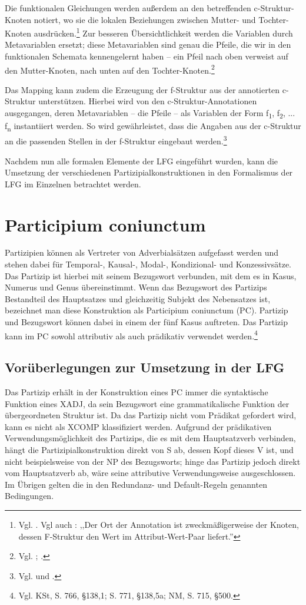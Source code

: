 \documentclass[12pt,a4paper]{article}
\begin{document}
Die funktionalen Gleichungen werden außerdem an den betreffenden c-Struktur-Knoten notiert, wo sie die lokalen Beziehungen zwischen Mutter- und Tochter-Knoten ausdrücken.\footnote{Vgl. \cite[69]{Falk}. Vgl auch \cite[12]{Skript}: ,,Der Ort der Annotation ist zweckmäßigerweise der Knoten, dessen F-Struktur den Wert im Attribut-Wert-Paar liefert.''} Zur besseren Übersichtlichkeit werden die Variablen durch Metavariablen ersetzt; diese Metavariablen sind genau die Pfeile, die wir in den funktionalen Schemata kennengelernt haben -- ein Pfeil nach oben verweist auf den Mutter-Knoten, nach unten auf den Tochter-Knoten.\footnote{Vgl. \cite[69]{Falk}; \cite[15-6]{Skript}.}

Das Mapping kann zudem die Erzeugung der f-Struktur aus der annotierten c-Struktur unterstützen. Hierbei wird von den c-Struktur-Annotationen ausgegangen, deren Metavariablen -- die Pfeile -- als Variablen der Form f\textsubscript{1}, f\textsubscript{2}, ... f\textsubscript{n} instantiiert werden. So wird gewährleistet, dass die Angaben aus der c-Struktur an die passenden Stellen in der f-Struktur eingebaut werden.\footnote{Vgl. \cite[34]{Rohrer} und \cite[8; 10-11; 14; 17; 19; 28; 54]{Skript}.} 

Nachdem nun alle formalen Elemente der LFG eingeführt wurden, kann die Umsetzung der verschiedenen Partizipialkonstruktionen in den Formalismus der LFG im Einzelnen betrachtet werden.

\section{Participium coniunctum}
Partizipien können als Vertreter von Adverbialsätzen aufgefasst werden und stehen dabei für Temporal-, Kausal-, Modal-, Kondizional- und Konzessivsätze. Das Partizip ist hierbei mit seinem Bezugswort verbunden, mit dem es in Kasus, Numerus und Genus übereinstimmt. Wenn das Bezugswort des Partizips Bestandteil des Hauptsatzes und gleichzeitig Subjekt des Nebensatzes ist, bezeichnet man diese Konstruktion als Participium coniunctum (PC). Partizip und Bezugswort können dabei in einem der fünf Kasus  auftreten. Das Partizip kann im PC sowohl attributiv als auch prädikativ verwendet werden.\footnote{Vgl. KSt, S. 766, §138,1; S. 771, §138,5a; NM, S. 715, §500.}

\subsection{Vorüberlegungen zur Umsetzung in der LFG}
Das Partizip erhält in der Konstruktion eines PC immer die syntaktische Funktion eines XADJ, da sein Bezugswort eine grammatikalische Funktion der übergeordneten Struktur ist. Da das Partizip nicht vom Prädikat gefordert wird, kann es nicht als XCOMP klassifiziert werden. Aufgrund der prädikativen Verwendungsmöglichkeit des Partizips, die es mit dem Hauptsatzverb verbinden, hängt die Partizipialkonstruktion direkt von S ab, dessen Kopf dieses V ist, und nicht beispielsweise von der NP des Bezugsworts; hinge das Partizip jedoch direkt vom Hauptsatzverb ab, wäre seine attributive Verwendungsweise ausgeschlossen.
Im Übrigen gelten die in den Redundanz- und Default-Regeln genannten Bedingungen.
\end{document}
